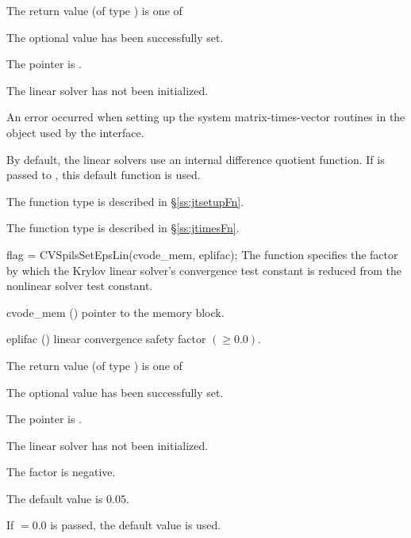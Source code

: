 {
  The return value  (of type ) is one of
  \begin{args}
  \item[\Id{CVSPILS\_SUCCESS}]
    The optional value has been successfully set.
  \item[\Id{CVSPILS\_MEM\_NULL}]
    The  pointer is .
  \item[\Id{CVSPILS\_LMEM\_NULL}]
    The {\cvspils} linear solver has not been initialized.
  \item[\Id{CVSPILS\_SUNLS\_FAIL}]
    An error occurred when setting up the system matrix-times-vector
    routines in the {\sunlinsol} object used by the {\cvspils}
    interface.
  \end{args}
}
{
  By default, the {\cvspils} linear solvers use an internal difference
  quotient function.  If  is passed to , this
  default function is used.

  The function type  is described in \S\ref{ss:jtsetupFn}.

  The function type  is described in \S\ref{ss:jtimesFn}.
}
{
  flag = CVSpilsSetEpsLin(cvode\_mem, eplifac);
}
{
  The function  specifies the factor by
  which the Krylov linear solver's convergence test constant is
  reduced from the nonlinear solver test constant.
}
{
  \begin{args}
  \item[cvode\_mem] ()
    pointer to the {\cvode} memory block.
  \item[eplifac] () linear convergence safety factor $(
    \geq 0.0)$.

  \end{args}
}
{
  The return value  (of type ) is one of
  \begin{args}
  \item[\Id{CVSPILS\_SUCCESS}]
    The optional value has been successfully set.
  \item[\Id{CVSPILS\_MEM\_NULL}]
    The  pointer is .
  \item[\Id{CVSPILS\_LMEM\_NULL}]
    The {\cvspils} linear solver has not been initialized.
  \item[\Id{CVSPILS\_ILL\_INPUT}]
    The factor  is negative.
  \end{args}
}
{
  The default value is $0.05$.

  If $ = 0.0$ is passed, the default value is used.
}


